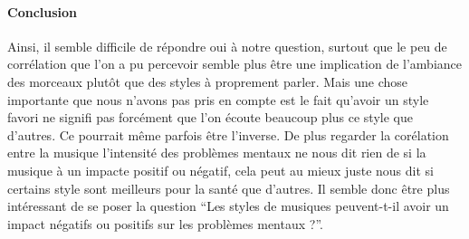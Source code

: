 \documentclass[
]{article}
\begin{document}
\hypertarget{conclusion-3}{%
\paragraph{\texorpdfstring{\textbf{Conclusion}}{Conclusion}}\label{conclusion-3}}

Ainsi, il semble difficile de répondre oui à notre question, surtout que
le peu de corrélation que l'on a pu percevoir semble plus être une
implication de l'ambiance des morceaux plutôt que des styles à
proprement parler. Mais une chose importante que nous n'avons pas pris
en compte est le fait qu'avoir un style favori ne signifi pas forcément
que l'on écoute beaucoup plus ce style que d'autres. Ce pourrait même
parfois être l'inverse. De plus regarder la corélation entre la musique
l'intensité des problèmes mentaux ne nous dit rien de si la musique à un
impacte positif ou négatif, cela peut au mieux juste nous dit si
certains style sont meilleurs pour la santé que d'autres. Il semble donc
être plus intéressant de se poser la question ``Les styles de musiques
peuvent-t-il avoir un impact négatifs ou positifs sur les problèmes
mentaux ?''.
\end{document}
